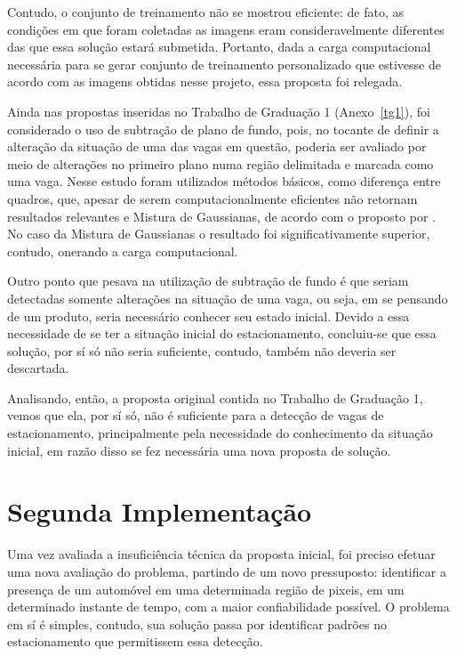 \documentclass[ecp,tc]{iiufrgs}
\begin{document}
Contudo, o conjunto de treinamento não se mostrou eficiente: de fato, as condições em que foram coletadas as imagens eram consideravelmente diferentes das que essa solução estará submetida. Portanto, dada a carga computacional necessária para se gerar conjunto de treinamento personalizado que estivesse de acordo com as imagens obtidas nesse projeto, essa proposta foi relegada.

Ainda nas propostas inseridas no Trabalho de Graduação 1 (Anexo~\ref{tg1}), foi considerado o uso de subtração de plano de fundo, pois, no tocante de definir a alteração da situação de uma das vagas em questão, poderia ser avaliado por meio de alterações no primeiro plano numa região delimitada e marcada como uma vaga. Nesse estudo foram utilizados métodos básicos, como diferença entre quadros, que, apesar de serem computacionalmente eficientes não retornam resultados relevantes e Mistura de Gaussianas, de acordo com o proposto por . No caso da Mistura de Gaussianas o resultado foi significativamente superior, contudo, onerando a carga computacional.

Outro ponto que pesava na utilização de subtração de fundo é que seriam detectadas somente alterações na situação de uma vaga, ou seja, em se pensando de um produto, seria necessário conhecer seu estado inicial. Devido a essa necessidade de se ter a situação inicial do estacionamento, concluiu-se que essa solução, por sí só não seria suficiente, contudo, também não deveria ser descartada.

Analisando, então, a proposta original contida no Trabalho de Graduação 1, vemos que ela, por sí só, não é suficiente para a detecção de vagas de estacionamento, principalmente pela necessidade do conhecimento da situação inicial, em razão disso se fez necessária uma nova proposta de solução.

\section{Segunda Implementação}

Uma vez avaliada a insuficiência técnica da proposta inicial, foi preciso efetuar uma nova avaliação do problema, partindo de um novo pressuposto: identificar a presença de um automóvel em uma determinada região de pixeis, em um determinado instante de tempo, com a maior confiabilidade possível. O problema em sí é simples, contudo, sua solução passa por identificar padrões no estacionamento que permitissem essa detecção.
\end{document}
